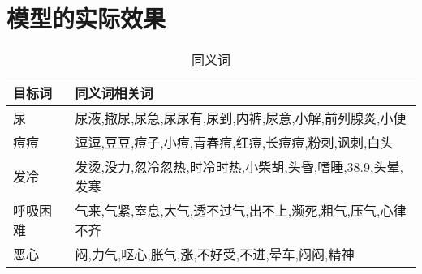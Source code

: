 \section{模型的实际效果}
\begin{table}[h]
    \centering  %
    \caption{同义词}  %
    \label{table1}  %
    \begin{tabular}{|l|l|}  
        \hline
        目标词 & 同义词相关词 \\
        \hline  %
        尿     & 尿液,撒尿,尿急,尿尿有,尿到,内裤,尿意,小解,前列腺炎,小便 \\
        \hline
        痘痘   & 逗逗,豆豆,痘子,小痘,青春痘,红痘,长痘痘,粉刺,讽刺,白头\\
        \hline
        发冷   & 发烫,没力,忽冷忽热,时冷时热,小柴胡,头昏,嗜睡,38.9,头晕,发寒 \\
        \hline
        呼吸困难&气来,气紧,窒息,大气,透不过气,出不上,濒死,粗气,压气,心律不齐\\
        \hline
        恶心    &闷,力气,呕心,胀气,涨,不好受,不进,晕车,闷闷,精神\\
        \hline
    \end{tabular}
\end{table}

